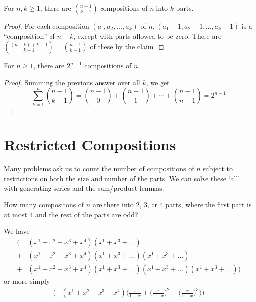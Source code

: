 \documentclass[12pt]{article}
\begin{document}
\begin{theorem}
For $n,k \geq 1$, there are ${n-1 \choose k-1}$ compositions of $n$ into $k$ parts.
\end{theorem}

\begin{proof}
For each composition $(a_1, a_2, \dots, a_k)$ of $n$, $(a_1 -1, a_2 -1, \dots, a_k -1)$ is a ``composition'' of $n-k$, except with parts allowed to be zero. There are ${(n-k)+k-1 \choose k-1} = {n-1 \choose k-1}$ of these by the claim.
\end{proof}

\begin{theorem}
For $n\geq 1$, there are $2^{n-1}$ compositions of $n$.
\end{theorem}

\begin{proof}
Summing the previous answer over all $k$, we get \[ \sum_{k=1}^n {n-1 \choose k-1} = {n-1 \choose 0} + {n-1 \choose 1} + \cdots + {n-1 \choose n-1} = 2^{n-1} \]
\end{proof}

\section{Restricted Compositions}
Many problems ask us to count the number of compositions of $n$ subject to restrictions on both the size and number of the parts. We can solve these `all' with generating series and the sum/product lemmas.

\begin{example}
How many compositons of $n$ are there into 2, 3, or 4 parts, where the first part is at most $4$ and the rest of the parts are odd?

We have
\begin{align*}
[x^n]\bigg(&(x^1 + x^2 + x^3 + x^4)(x^1 + x^3 + \dots)\\
+ &(x^1 + x^2 + x^3 + x^4)(x^1 + x^3 + \dots)(x^1 + x^3 + \dots)\\
+ &(x^1 + x^2 + x^3 + x^4)(x^1 + x^3 + \dots)(x^1 + x^3 + \dots)(x^1 + x^3 + \dots)\bigg)
\end{align*}
or more simply
\begin{align*}
[x^n]\bigg(&(x^1 + x^2 + x^3 + x^4)\bigg(\frac{x}{1-x} + {\bigg(\frac{x}{1-x}\bigg)}^2 + {\bigg(\frac{x}{1-x}\bigg)}^3\bigg)\bigg)\\
\end{align*}
\end{example}
\end{document}
